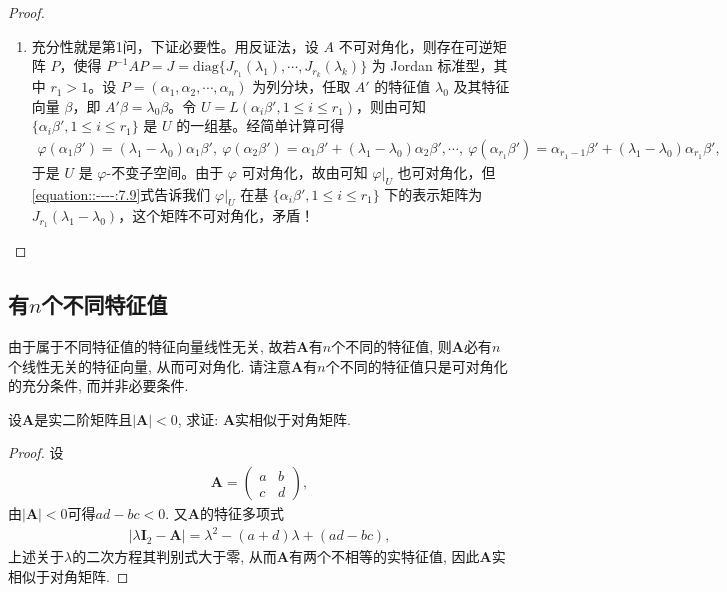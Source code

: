 \documentclass[../../main.tex]{subfiles}
\begin{document}
\begin{proof}
\begin{enumerate}
\item 充分性就是第1问，下证必要性。用反证法，设 $A$ 不可对角化，则存在可逆矩阵 $P$，使得 $P^{-1}AP = J = \mathrm{diag}\{J_{r_1}(\lambda_1),\cdots,J_{r_k}(\lambda_k)\}$ 为 Jordan 标准型，其中 $r_1 > 1$。设 $P = (\alpha_1,\alpha_2,\cdots,\alpha_n)$ 为列分块，任取 $A'$ 的特征值 $\lambda_0$ 及其特征向量 $\beta$，即 $A'\beta = \lambda_0\beta$。令 $U = L(\alpha_i\beta',1\leqslant  i\leqslant  r_1)$，则由可知 $\{\alpha_i\beta',1\leqslant  i\leqslant  r_1\}$ 是 $U$ 的一组基。经简单计算可得
\begin{align}\label{equation::----:7.9}
\varphi(\alpha_1\beta')=(\lambda_1 - \lambda_0)\alpha_1\beta',\ \varphi(\alpha_2\beta')=\alpha_1\beta' + (\lambda_1 - \lambda_0)\alpha_2\beta',\cdots,\ \varphi(\alpha_{r_1}\beta')=\alpha_{r_1 - 1}\beta' + (\lambda_1 - \lambda_0)\alpha_{r_1}\beta',
\end{align}
于是 $U$ 是 $\varphi$-不变子空间。由于 $\varphi$ 可对角化，故由可知 $\varphi|_U$ 也可对角化，但\eqref{equation::----:7.9}式告诉我们 $\varphi|_U$ 在基 $\{\alpha_i\beta',1\leqslant  i\leqslant  r_1\}$ 下的表示矩阵为 $J_{r_1}(\lambda_1 - \lambda_0)$，这个矩阵不可对角化，矛盾！
\end{enumerate}
\end{proof}

\subsection{有$n$个不同特征值}

由于属于不同特征值的特征向量线性无关, 故若$\boldsymbol{A}$有$n$个不同的特征值, 则$\boldsymbol{A}$必有$n$个线性无关的特征向量, 从而可对角化. 请注意$\boldsymbol{A}$有$n$个不同的特征值只是可对角化的充分条件, 而并非必要条件. 

\begin{example}
设$\boldsymbol{A}$是实二阶矩阵且$|\boldsymbol{A}|< 0$, 求证: $\boldsymbol{A}$实相似于对角矩阵.
\end{example}
\begin{proof}
设
\begin{align*}
\boldsymbol{A}=\begin{pmatrix}
a&b\\
c&d
\end{pmatrix},
\end{align*}
由$|\boldsymbol{A}|< 0$可得$ad - bc< 0$. 又$\boldsymbol{A}$的特征多项式
\begin{align*}
|\lambda\boldsymbol{I}_2-\boldsymbol{A}|=\lambda^2-(a + d)\lambda+(ad - bc),
\end{align*}
上述关于$\lambda$的二次方程其判别式大于零, 从而$\boldsymbol{A}$有两个不相等的实特征值, 因此$\boldsymbol{A}$实相似于对角矩阵.
\end{proof}
\end{document}
